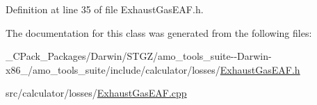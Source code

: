 Definition at line 35 of file Exhaust\+Gas\+E\+A\+F.\+h.



The documentation for this class was generated from the following files\+:\begin{DoxyCompactItemize}
\item 
\+\_\+\+C\+Pack\+\_\+\+Packages/\+Darwin/\+S\+T\+G\+Z/amo\+\_\+tools\+\_\+suite-\/-\/\+Darwin-\/x86\+\_/amo\+\_\+tools\+\_\+suite/include/calculator/losses/\hyperlink{___c_pack___packages_2_darwin_2_s_t_g_z_2amo__tools__suite--_darwin-x86__64_2amo__tools__suite_2c5136a7303077cb660b86ee43dc41ed7}{Exhaust\+Gas\+E\+A\+F.\+h}\item 
src/calculator/losses/\hyperlink{_exhaust_gas_e_a_f_8cpp}{Exhaust\+Gas\+E\+A\+F.\+cpp}\end{DoxyCompactItemize}
